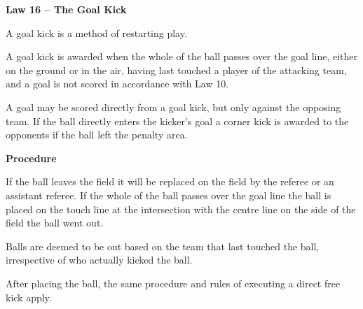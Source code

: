 \clearpage
\sffamily
{\bfseries
\textcolor[rgb]{0.4,0.4,0.4}{Law 16 -- The Goal Kick} }
{}


\bigskip

A goal kick is a method of restarting play.

\bigskip

A goal kick is awarded when the whole of the ball passes over the goal line, either on the ground or in the air, having last touched a player of the attacking team, and a goal is not scored in accordance with Law
10.

\bigskip

A goal may be scored directly from a goal kick, but only against the opposing team.
If the ball directly enters the kicker's goal a corner kick is awarded to the
opponents if the ball left the penalty area.

\bigskip

\bigskip

{\bfseries Procedure}

\headlinebox

If the ball leaves the field it will be replaced on the field by the referee or
an assistant referee.
If the whole of the ball passes over the goal line the ball is placed on the
touch line at the intersection with the centre line on the side of the field
the ball went out.

\bigskip

Balls are deemed to be out based on the team that last touched the ball, irrespective of who actually kicked the ball. 

\bigskip

After placing the ball, the same procedure and rules of executing a direct free kick apply.

\bigskip


